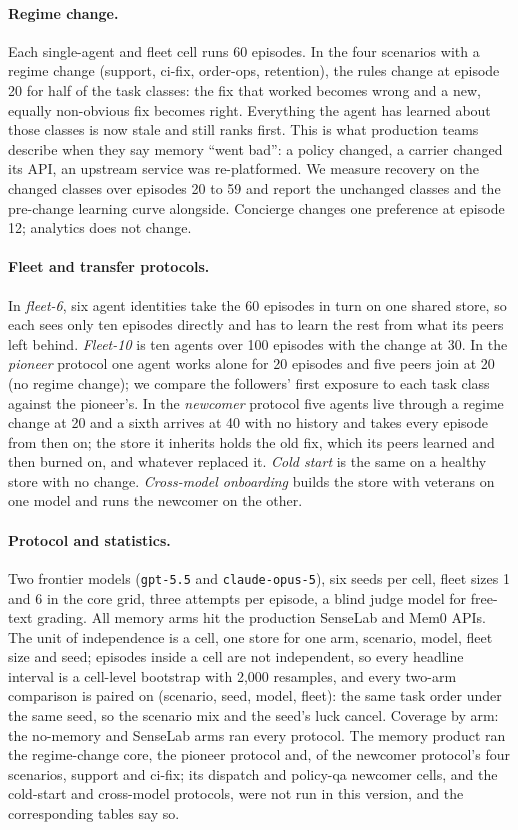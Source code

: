 \documentclass[11pt]{article}
\begin{document}
\paragraph{Regime change.} Each single-agent and fleet cell runs 60 episodes. In the four
scenarios with a regime change (support, ci-fix, order-ops, retention), the rules change at
episode 20 for half of the task classes: the fix that worked becomes wrong and a new, equally
non-obvious fix becomes right. Everything the agent has learned about those classes is now
stale and still ranks first. This is what production teams describe when they say memory
``went bad'': a policy changed, a carrier changed its API, an upstream service was
re-platformed. We measure recovery on the changed classes over episodes 20 to 59 and report the
unchanged classes and the pre-change learning curve alongside. Concierge changes one preference
at episode 12; analytics does not change.

\paragraph{Fleet and transfer protocols.} In \emph{fleet-6}, six agent identities take the 60
episodes in turn on one shared store, so each sees only ten episodes directly and has to learn
the rest from what its peers left behind. \emph{Fleet-10} is ten agents over 100 episodes with
the change at 30. In the \emph{pioneer} protocol one agent works alone for 20 episodes and five
peers join at 20 (no regime change); we compare the followers' first exposure to each task
class against the pioneer's. In the \emph{newcomer} protocol five agents live through a regime
change at 20 and a sixth arrives at 40 with no history and takes every episode from then on;
the store it inherits holds the old fix, which its peers learned and then burned on, and
whatever replaced it. \emph{Cold start} is the same on a healthy store with no change.
\emph{Cross-model onboarding} builds the store with veterans on one model and runs the newcomer
on the other.

\paragraph{Protocol and statistics.} Two frontier models (\texttt{gpt-5.5} and
\texttt{claude-opus-5}), six seeds per cell, fleet sizes 1 and 6 in the core grid, three
attempts per episode, a blind judge model for free-text grading. All memory arms hit the
production SenseLab and Mem0 APIs. The unit of independence is a cell, one store for
one arm, scenario, model, fleet size and seed; episodes inside a cell are not independent, so
every headline interval is a cell-level bootstrap with 2{,}000 resamples, and every two-arm
comparison is paired on (scenario, seed, model, fleet): the same task order under the same
seed, so the scenario mix and the seed's luck cancel. Coverage by
arm: the no-memory and SenseLab arms ran every protocol. The memory product ran the
regime-change core, the pioneer protocol and, of the newcomer protocol's four scenarios, support
and ci-fix; its dispatch and policy-qa newcomer cells, and the cold-start and cross-model
protocols, were not run in this version, and the corresponding tables say so.
\end{document}
